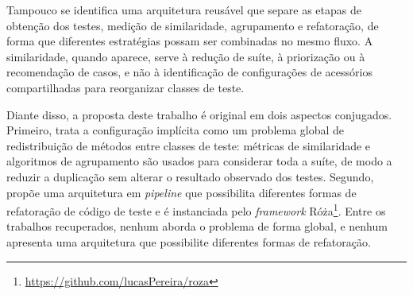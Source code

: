 Tampouco se identifica uma arquitetura reusável que separe as etapas de obtenção dos testes, medição de similaridade, agrupamento e refatoração, de forma que diferentes estratégias possam ser combinadas no mesmo fluxo. A similaridade, quando aparece, serve à redução de suíte, à priorização ou à recomendação de casos, e não à identificação de configurações de acessórios compartilhadas para reorganizar classes de teste.

Diante disso, a proposta deste trabalho é original em dois aspectos conjugados. Primeiro, trata a configuração implícita como um problema global de redistribuição de métodos entre classes de teste: métricas de similaridade e algoritmos de agrupamento são usados para considerar toda a suíte, de modo a reduzir a duplicação sem alterar o resultado observado dos testes. Segundo, propõe uma arquitetura em \textit{pipeline} que possibilita diferentes formas de refatoração de código de teste e é instanciada pelo \textit{framework} Róża\footnote{\url{https://github.com/lucasPereira/roza}}. Entre os trabalhos recuperados, nenhum aborda o problema de forma global, e nenhum apresenta uma arquitetura que possibilite diferentes formas de refatoração.
